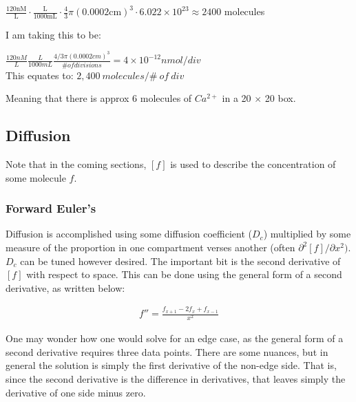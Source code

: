 \documentclass[12pt]{amsart}
\begin{document}
\bigskip

\begin{center}
    $\frac{120\mathrm{nM}}{\mathrm{L}} \cdot \frac{\mathrm{L}}{1000\mathrm{mL}} \cdot {\frac{4}{3}\pi(0.000\mathrm{2cm})^3} \cdot 6.022\times 10^{23} \approx 2400$ molecules\\
\end{center}


\bigskip

I am taking this to be: 

\bigskip

\begin{center}
    $\frac{120nM}{L}\frac{L}{1000mL}\frac{4/3\pi(0.0002cm)^3}{\# of divisions} = 4\times10^{-12} nmol/div$\\
    This equates to: 
    $2,400 \: molecules / \# \: of \: div$
\end{center}

\bigskip

Meaning that there is approx 6 molecules of $Ca^{2+}$ in a 20 $\times$ 20 box.

\subsection{Diffusion} Note that in the coming sections, $[f]$ is used to describe the concentration of some molecule $f$. 

\subsubsection{Forward Euler's} Diffusion is accomplished using some diffusion coefficient ($D_c$) multiplied by some measure of the proportion in one compartment verses another (often $\partial^2 [f]/\partial x^2)$. $D_c$ can be tuned however desired. The important bit is the second derivative of $[f]$ with respect to space. This can be done using the general form of a second derivative, as written below: 

\begin{equation} \label{eq8}
\begin{split}
f'' = \frac{f_{x + 1} - 2f_x + f_{x - 1}}{x^2}
\end{split}
\end{equation}

\bigskip

One may wonder how one would solve for an edge case, as the general form of a second derivative requires three data points. There are some nuances, but in general the solution is simply the first derivative of the non-edge side. That is, since the second derivative is the difference in derivatives, that leaves simply the derivative of one side minus zero.\newline
\end{document}

